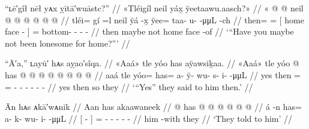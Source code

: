 \ex\label{ex:92-150-maybe-lonesome-for-home}%
%
\begingl
	\glpreamble	“ʟē′gîł nēł yᴀx ỵītā′wuāstc?” //
	\glpreamble	«\!Tléigíl neil yáx̱ ÿeetaawu.aasch?\!» //
	\gla	«\! @ {} @ {}
		{} neil  @ {} {}
		 @ {} @ {} @ {} @ {} @ {}  //
	\glb	\pqp{}tléi= gí =l
		{} neil ÿá -x̱ {}
		ÿee= taa- u-  -μμL -ch //
	\glc	\pqp{}then=  =
		{}[ home face - {}]
		= bottom- -  - - //
	\gld	\pqp{}then maybe \•not
		{} home face -of {}
		 {} {} {} {} {} //
	\glft	‘“Have you maybe not been lonesome for home?”’
		//
\endgl
\xe




\ex\label{ex:92-151-said-yes}%
%
\begingl
	\glpreamble	“Ā′a,” ʟayū′ hᴀs aỵao′sîqa. //
	\glpreamble	«\!Aaá\!» tle yóo has aÿawsiḵaa. //
	\gla	«\!Aaá\!» tle yóo @ has @  @ {} @ {} @ {} @ {} @ {} @ {} @ {} //
	\glb	\pqp{}aaá tle yóo= has= a- ÿ- wu- s- i-  -μμL //
	\glc	\pqp{}yes then = = - - - -
			-  - //
	\gld	\pqp{}yes then so they  {} {} {} {} {} {} {} //
	\glft	‘“Yes” they said to him then.’
		//
\endgl
\xe

\ex\label{ex:92-152-told-to-him}%
%
\begingl
	\glpreamble	Ān hᴀs ᴀkā′wᴀnik //
	\glpreamble	Aan has akaawaneek //
	\gla	{}  @ {} {} has @  @ {} @ {} @ {} @ {} @ {} //
	\glb	{} á -n {} has= a- k- wu- i-  -μμL //
	\glc	{}[  - {}]
		= - - - -  - //
	\gld	{} him -with {} they  {} {} {} {} {} //
	\glft	‘They told to him’
		//
\endgl
\xe

